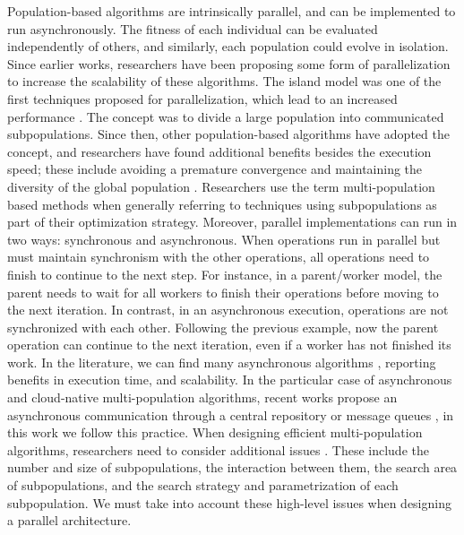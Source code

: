 \documentclass[review]{elsarticle}
\begin{document}
Population-based algorithms are intrinsically parallel, and can be implemented to run asynchronously.
The fitness of each individual can be evaluated independently of 
others, and similarly, each population could evolve in isolation. Since 
earlier works, researchers have been proposing some form of parallelization
\cite{muhlenbein1988evolution} to increase the scalability of these algorithms.
The island model was one of the first techniques proposed for parallelization,
which lead to an increased performance \cite{gorges1990explicit,grosso1985computer}. 
The concept was to divide a large population into communicated subpopulations. 
Since then, other population-based algorithms have adopted the concept, 
and researchers have found additional benefits
besides the execution speed; these include avoiding a premature convergence and
maintaining the diversity of the global population \cite{li2015multi}. Researchers use the term
multi-population based methods when generally referring to techniques using
subpopulations as part of their optimization strategy. %
Moreover, parallel implementations can run in two ways: synchronous and
asynchronous. When operations run in parallel but must maintain synchronism with
the other operations,  all operations need to finish to continue to the next
step. For instance, in a  parent/worker model, the parent needs to wait for all
workers to finish their operations before moving to the next iteration.  In
contrast, in an asynchronous execution,  operations are not synchronized with
each other. Following the previous example, now the parent operation can
continue to the next iteration, even if a worker has not finished its work.  In
the literature, we can find many asynchronous algorithms
\cite{coleman89,baugh2003asynchronous}, reporting benefits in execution time,
and scalability. In the particular case of asynchronous and cloud-native
multi-population algorithms, recent works propose an asynchronous communication
through a central repository \cite{sofea:cec2012, JSON} or message queues
\cite{salza2019speed, guervos2018introducing}, in this work we follow this
practice.
When designing efficient multi-population algorithms, researchers need to
consider additional issues \cite{Ma2019}. These include the number and size of subpopulations,
the interaction between them, the search area of subpopulations, and the search
strategy and parametrization of each subpopulation. We must take into account
these high-level issues when designing a parallel architecture. 
\end{document}
